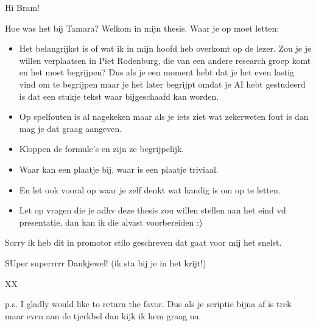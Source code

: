 Hi Bram!

Hoe was het bij Tamara? Welkom in mijn thesis.  Waar je op moet letten:\\

\begin{itemize}
\item Het belangrijkst is of wat ik in mijn hoofd heb overkomt op de lezer.
Zou je je willen verplaatsen in Piet Rodenburg, die van een andere research
groep komt en het moet begrijpen? Dus als je een moment hebt dat je het even lastig
vind om te begrijpen maar je het later begrijpt omdat je AI hebt gestudeerd is
dat een stukje tekst waar bijgeschaafd kan worden.\\
\item Op spelfouten is al nagekeken maar als je iets ziet wat zekerweten fout is dan mag
je dat graag aangeven.\\
\item Kloppen de formule's en zijn ze begrijpelijk.
\item Waar kan een plaatje bij, waar is een plaatje triviaal.
\item En let ook vooral op waar je zelf denkt wat handig is om op te letten.
\item Let op vragen die je adhv deze thesis zou willen stellen aan het eind vd
presentatie, dan kan ik die alvast voorbereiden :)
\end{itemize}

Sorry ik heb dit in promotor stilo geschreven dat gaat voor mij het snelst.

SUper superrrrr Dankjewel! (ik sta bij je in het krijt!)

XX

p.s. I gladly would like to return the favor. Dus als je scriptie bijna af is
trek maar even aan de tjerkbel dan kijk ik hem graag na.
